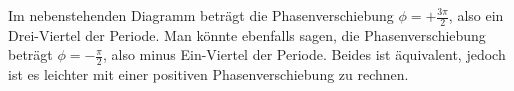 Im nebenstehenden Diagramm beträgt die Phasenverschiebung $\phi = +\frac{3\pi}{2}$, also ein Drei-Viertel der Periode. Man könnte ebenfalls sagen, die Phasenverschiebung beträgt $\phi = -\frac{\pi}{2}$, also minus Ein-Viertel der Periode. Beides ist äquivalent, jedoch ist es leichter mit einer positiven Phasenverschiebung zu rechnen.
	